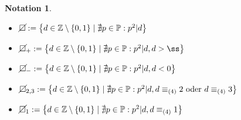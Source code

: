 \documentclass[
twoside=semi,
fontsize=12,
DIV=12, 
cleardoublepage=current,
leqno,
headings=optiontoheadandtoc, 
toc=idx
]{scrbook}
\newcommand{\Z}{\mathbb{Z}}
\renewcommand{\P}{\mathbb{P}}
\newcommand{\nsquare}{\cancel{\square}}
\newcommand{\set}[1]{\left\{ #1 \right\}}
\theoremstyle{definition}
\newtheorem{notation}[definition]{Notation}
\begin{document}
 	\begin{notation}\label{2.1.16}\hfill
 		\begin{itemize}
 			\item $\nsquare := \set{d\in\Z \setminus\set{0,1} \mid \nexists p \in \P: p^2|d}$
 			\item $\nsquare_+ := \set{d\in\Z \setminus\set{0,1} \mid \nexists p \in \P: p^2|d, d > ß}$
 			\item $\nsquare_- := \set{d\in\Z \setminus\set{0,1} \mid \nexists p \in \P: p^2|d, d < 0}$
 			\item $\nsquare_{2,3} := \set{d\in\Z \setminus\set{0,1} \mid \nexists p \in \P: p^2|d, d \equiv_{(4)} 2 \textrm{ oder } d \equiv_{(4)} 3 } $
 			\item $\nsquare_{1} := \set{d\in\Z \setminus\set{0,1} \mid \nexists p \in \P: p^2|d, d \equiv_{(4)} 1 } $
 		\end{itemize}
 	\end{notation}
 
\end{document}
